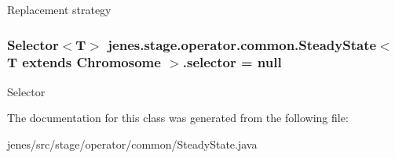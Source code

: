 Replacement strategy \hypertarget{classjenes_1_1stage_1_1operator_1_1common_1_1_steady_state_3_01_t_01extends_01_chromosome_01_4_a83a734a69acdc4ee13d42982a43e8ba1}{
\subsubsection[{selector}]{\setlength{\rightskip}{0pt plus 5cm}Selector$<$T$>$ jenes.\-stage.\-operator.\-common.\-Steady\-State$<$ T extends Chromosome $>$.selector = null\hspace{0.3cm}{\ttfamily [protected]}}}\label{classjenes_1_1stage_1_1operator_1_1common_1_1_steady_state_3_01_t_01extends_01_chromosome_01_4_a83a734a69acdc4ee13d42982a43e8ba1}
Selector 

The documentation for this class was generated from the following file\-:\begin{DoxyCompactItemize}
\item 
jenes/src/stage/operator/common/Steady\-State.\-java\end{DoxyCompactItemize}
